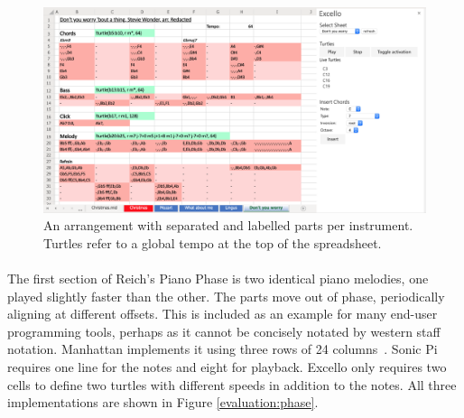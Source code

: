 \begin{figure}[tbh]
\centerline{\includegraphics[width=150mm]{figs/excelloFranzRedacted.png}}
\caption{An arrangement with separated and labelled parts per instrument. Turtles refer to a global tempo at the top of the spreadsheet.}
\label{evaluation:excelloFranzRedacted}
\end{figure}

\paragraph{} The first section of Reich's Piano Phase is two identical piano melodies, one played slightly faster than the other. The parts move out of phase, periodically aligning at different offsets. This is included as an example for many end-user programming tools, perhaps as it cannot be concisely notated by western staff notation. Manhattan implements it using three rows of 24 columns~\cite{nash:manhattan}. Sonic Pi requires one line for the notes and eight for playback. Excello only requires two cells to define two turtles with different speeds in addition to the notes. All three implementations are shown in Figure \ref{evaluation:phase}.

